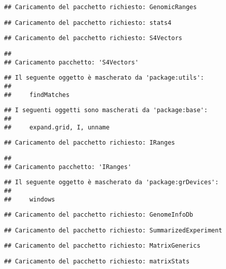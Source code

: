 \documentclass[
]{article}
\begin{document}
\begin{verbatim}
## Caricamento del pacchetto richiesto: GenomicRanges
\end{verbatim}

\begin{verbatim}
## Caricamento del pacchetto richiesto: stats4
\end{verbatim}

\begin{verbatim}
## Caricamento del pacchetto richiesto: S4Vectors
\end{verbatim}

\begin{verbatim}
## 
## Caricamento pacchetto: 'S4Vectors'
\end{verbatim}

\begin{verbatim}
## Il seguente oggetto è mascherato da 'package:utils':
## 
##     findMatches
\end{verbatim}

\begin{verbatim}
## I seguenti oggetti sono mascherati da 'package:base':
## 
##     expand.grid, I, unname
\end{verbatim}

\begin{verbatim}
## Caricamento del pacchetto richiesto: IRanges
\end{verbatim}

\begin{verbatim}
## 
## Caricamento pacchetto: 'IRanges'
\end{verbatim}

\begin{verbatim}
## Il seguente oggetto è mascherato da 'package:grDevices':
## 
##     windows
\end{verbatim}

\begin{verbatim}
## Caricamento del pacchetto richiesto: GenomeInfoDb
\end{verbatim}

\begin{verbatim}
## Caricamento del pacchetto richiesto: SummarizedExperiment
\end{verbatim}

\begin{verbatim}
## Caricamento del pacchetto richiesto: MatrixGenerics
\end{verbatim}

\begin{verbatim}
## Caricamento del pacchetto richiesto: matrixStats
\end{verbatim}
\end{document}
